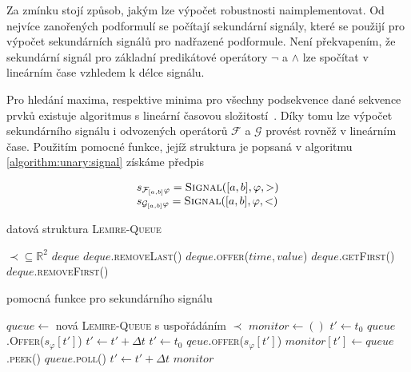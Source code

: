 Za zmínku stojí způsob, jakým lze výpočet robustnosti naimplementovat. Od nejvíce zanořených
podformulí se počítají sekundární signály, které se použijí pro výpočet sekundárních signálů
pro nadřazené podformule. Není překvapením, že sekundární signál pro základní predikátové operátory
$\neg$ a $\wedge$ lze spočítat v lineárním čase vzhledem k délce signálu.

Pro hledání maxima,
respektive minima pro všechny podsekvence dané sekvence prvků existuje algoritmus s lineární časovou složitostí~\cite{lemire2006}. Díky tomu lze
výpočet sekundárního signálu i odvozených operátorů $\mathcal{F}$ a $\mathcal{G}$ pro\-vést
rovněž v lineárním čase. Použitím pomocné funkce, jejíž struktura je popsaná v algoritmu \ref{algorithm:unary:signal}
získáme předpis 

\begin{align}\label{eq:future:gloabally:robustness:impl}
\begin{array}{ll}
s_{\mathcal{F}_{[a,b]}\varphi} = \textsc{Signal}([a,b], \varphi, >)				\\
s_{\mathcal{G}_{[a,b]}\varphi} = \textsc{Signal}([a,b], \varphi, <)
\end{array}
\end{align}

\begin{algorithm}
\caption{datová struktura \textsc{Lemire-Queue}\cite{lemire2006}}
\begin{algorithmic}[1]
\Require 	$\prec \subseteq \mathbb{R}^2$ 
\State $deque$ 
		\State $deque$.\textsc{removeLast()}
	\EndWhile
	\State $deque$.\textsc{offer(}$time, value$\textsc{)}
\EndFunction
{}
	\State\Return $deque$.\textsc{getFirst()}
\EndFunction
{}
	\State\Return $deque$.\textsc{removeFirst()}
\EndFunction
\end{algorithmic}
\end{algorithm}

\begin{algorithm}\label{algorithm:unary:signal}
\caption{pomocná funkce pro sekundárního signálu}
\begin{algorithmic}[1]
	\State	$queue \gets $ nová \textsc{Lemire-Queue} s uspořádáním $\prec$
	\State	$monitor \gets ()$
	\State	$t' \gets t_0$
		\State $queue$.\textsc{Offer}($s_\varphi[t']$)
		\State $t' \gets t' + \Delta t$
	\EndWhile
	\State	$t' \gets t_0$
		\State	$qeue$.\textsc{offer}($s_\varphi[t']$)
		\State	$monitor[t'] \gets queue$.\textsc{peek()}
			\State	$queue$.\textsc{poll()}
		\EndIf
		\State	$t' \gets t' + \Delta t$
	\EndWhile
	\State\Return $monitor$
\EndFunction
\end{algorithmic}
\end{algorithm}

